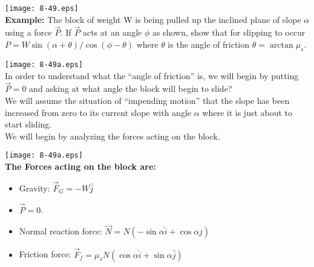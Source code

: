 \documentclass{seminar}
\begin{document}
\begin{slide}
\texttt{[image: 8-49.eps]}\\
{\bf\blue Example:} The block of weight W is being pulled up the
inclined plane of slope $\alpha$ using a force $\vec P$.  If $\vec
P$ acts at an angle $\phi$ as shown, show that for slipping to occur
$P=W\sin(\alpha+\theta)/\cos(\phi-\theta)$ where $\theta$ is the
angle of friction $\theta=\arctan\mu_s$.


\vfill
\end{slide}










\begin{slide}
\texttt{[image: 8-49a.eps]}\\
 In order to understand what
the ``angle of friction'' is, we will begin by putting $\vec P=0$ and
asking at what angle the block will begin to slide?\\ We will assume
the situation of ``impending motion'' that the slope has been
increased from zero to its current slope with angle $\alpha$ where it
is just about to start sliding.  \\
We will begin by analyzing the forces acting on the block.
\vfill
\end{slide}



\begin{slide}
\texttt{[image: 8-49a.eps]}\\
{\bf\blue The Forces acting on the block are:}\\
\begin{itemize}
\item{}Gravity: $\vec F_G = -W\hat j$
\item{}$\vec P=0$.
\item{}Normal reaction force: $\vec N = N\left( -\sin\alpha \hat i +
\cos\alpha\hat j\right)$
\item{}Friction force: $\vec F_f = \mu_s N \left( \cos\alpha \hat i
+\sin\alpha\hat j\right)$
\end{itemize}
\vfill
\end{slide}
\end{document}
